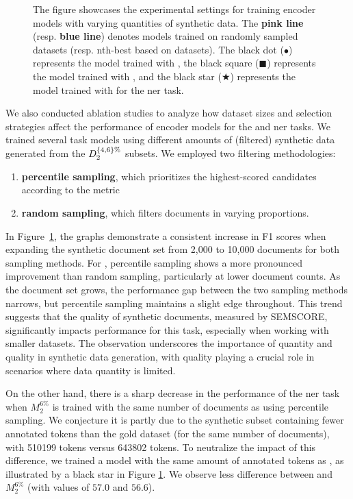 \begin{figure}[htb]
    \centering
    \resizebox{.9\textwidth}{!}{}
    \caption{The figure showcases the experimental settings for training encoder models with varying quantities of synthetic data. The \textcolor{pinkLine}{\textbf{pink line}} (resp. \textcolor{blueLine}{\textbf{blue line}}) denotes models trained on randomly sampled datasets (resp. nth-best based on \score datasets). The black dot ($\bullet$) represents the model trained with \dgold, the black square ($\blacksquare$) represents the model trained with \dgover, and the black star ($\bigstar$) represents the model trained with \dgold for the \gls{ner} task.}
    \label{fig:samplings}
\end{figure}

We also conducted ablation studies to analyze how dataset sizes and selection strategies affect the performance of encoder models for the  and \gls{ner} tasks.
We trained several task models using different amounts of (filtered) synthetic data generated from the $D_{2}^{\{4,6\}\%}$ subsets. We employed two filtering methodologies:
\begin{enumerate}
\item \textbf{percentile sampling}, which prioritizes the highest-scored candidates according to the \score metric
\item \textbf{random sampling}, which filters documents in varying proportions.
\end{enumerate}

In Figure~\ref{fig:samplings}, the graphs demonstrate a consistent increase in F1 scores when expanding the synthetic document set from 2,000 to 10,000 documents for both sampling methods. For , percentile sampling shows a more pronounced improvement than random sampling, particularly at lower document counts. As the document set grows, the performance gap between the two sampling methods narrows, but percentile sampling maintains a slight edge throughout. This trend suggests that the quality of synthetic documents, measured by SEMSCORE, significantly impacts performance for this task, especially when working with smaller datasets. The observation underscores the importance of quantity and quality in synthetic data generation, with quality playing a crucial role in scenarios where data quantity is limited.

On the other hand, there is a sharp decrease in the performance of the \gls{ner} task when $M_{2}^{6\%}$ is trained with the same number of documents as \mgold using percentile sampling. We conjecture it is partly due to the synthetic subset containing fewer annotated tokens than the gold dataset (for the same number of documents), with \num{510199} tokens versus \num{643802} tokens. To neutralize the impact of this difference, we trained a model with the same amount of annotated tokens as \dgold, as illustrated by a black star in Figure \ref{fig:samplings}. We observe less difference between \mgold and $M_{2}^{6\%}$ (with values of $57.0$ and $56.6$).

